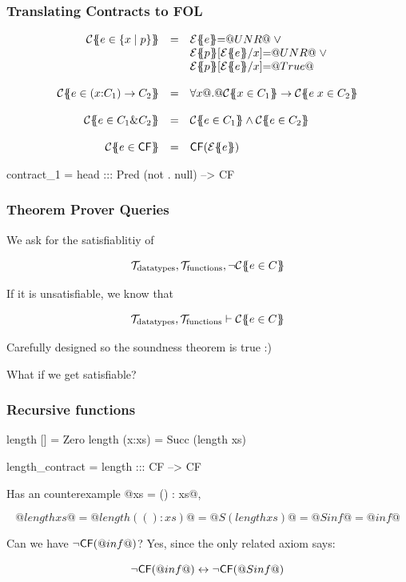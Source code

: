 \documentclass[serif,professionalfont]{beamer}
\begin{document}
\begin{frame}[fragile]
  \frametitle{Translating Contracts to FOL}
  \[\begin{array}{rcl}
  \trc{e \in \{x \mid p \}}
    & = &      \etrans{}{}{e} {=} \unr \; \lor \; \\
    &   &      \etrans{}{}{p}[\etrans{}{}{e}/x] {=} \unr \; \lor \; \\
    &   &      \etrans{}{}{p}[\etrans{}{}{e}/x] {=} \True
  \\ \\
  \trc{e \in (x{:}C_1) \to C_2}
    & = & \formula{\forall x @.@  \trc{x \in C_1} \to \trc{e\;x \in C_2}}
  \\ \\
  \trc{e \in C_1 \& C_2}
     & = & \formula{ \trc{e \in C_1} \land \trc{e \in C_2}}
  \\ \\
  \trc{e \in \cf} & = & \formula{\cf({\etrans{\Sigma}{\Gamma}{e}})} \\
  \end{array}\]

  \begin{code}
    contract_1 = head ::: Pred (not . null) --> CF
  \end{code}

\end{frame}

\begin{frame}[fragile]
  \frametitle{Theorem Prover Queries}

  We ask for the satisfiablitiy of

  $$
    \mathcal{T}_{\text{datatypes}}, \mathcal{T}_{\text{functions}} ,
    \neg {\cal C}\{\!\!\{e \in C\}\!\!\}
  $$

  If it is unsatisfiable, we know that

  $$
    \mathcal{T}_{\text{datatypes}}, \mathcal{T}_{\text{functions}} \vdash
    {\cal C}\{\!\!\{e \in C\}\!\!\}
  $$

  Carefully designed so the soundness theorem is true :)

  What if we get satisfiable?

\end{frame}

\begin{frame}[fragile]
  \frametitle{Recursive functions}

  \begin{code}
    length []     = Zero
    length (x:xs) = Succ (length xs)

    length_contract = length ::: CF --> CF
  \end{code}

  Has an counterexample @xs = () : xs@,

  $$@length xs@ = @length (() : xs)@ = @S (length xs)@ = @S inf@ = @inf@$$

  Can we have $\neg\mathsf{CF}(@inf@)$? Yes, since the only related axiom says:

  $$\neg\mathsf{CF}(@inf@) \leftrightarrow \neg\mathsf{CF}(@S inf@)$$

\end{frame}
\end{document}
